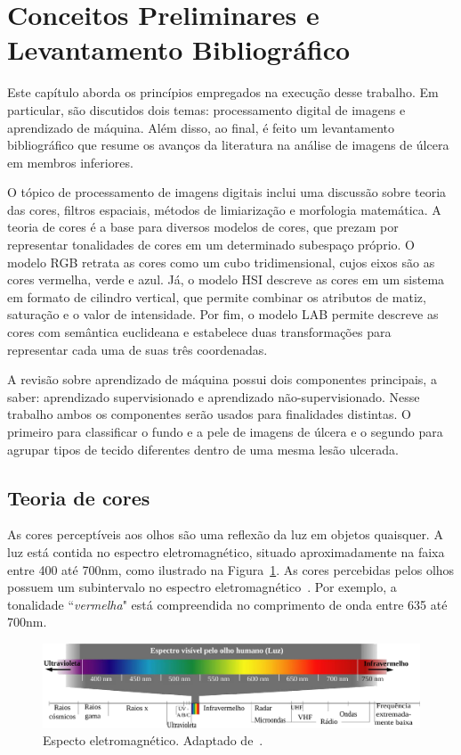 \clearpage
\section{Conceitos Preliminares e Levantamento Bibliográfico}\label{sec:background}

Este capítulo aborda os princípios empregados na execução desse trabalho.
Em particular, são discutidos dois temas: processamento digital de imagens e aprendizado de máquina.
Além disso, ao final, é feito um levantamento bibliográfico que resume os avanços da literatura na análise de imagens de úlcera em membros inferiores.

O tópico de processamento de imagens digitais inclui uma discussão sobre teoria das cores, filtros espaciais, métodos de limiarização e morfologia matemática.
A teoria de cores é a base para diversos modelos de cores, que prezam por representar tonalidades de cores em um determinado subespaço próprio.
O modelo RGB retrata as cores como um cubo tridimensional, cujos eixos são as cores vermelha, verde e azul.
Já, o modelo HSI descreve as cores em um sistema em formato de cilindro vertical, que permite combinar os atributos de matiz, saturação e o valor de intensidade.
Por fim, o modelo LAB permite descreve as cores com semântica euclideana e estabelece duas transformações para representar cada uma de suas três coordenadas.

A revisão sobre aprendizado de máquina possui dois componentes principais, a saber: aprendizado supervisionado e aprendizado não-supervisionado.
Nesse trabalho ambos os componentes serão usados para finalidades distintas.
O primeiro para classificar o fundo e a pele de imagens de úlcera e o segundo para agrupar tipos de tecido diferentes dentro de uma mesma lesão ulcerada.

\subsection{Teoria de cores}

As cores perceptíveis aos olhos são uma reflexão da luz em objetos quaisquer.
A luz está contida no espectro eletromagnético, situado aproximadamente na faixa entre 400 até 700nm, como ilustrado na Figura~\ref{figEspectroEletromagnetico}.
As cores percebidas pelos olhos possuem um subintervalo no espectro eletromagnético~\cite{Gonzalez2008}.
Por exemplo, a tonalidade ``\textit{vermelha}" está compreendida no comprimento de onda entre 635 até 700nm.

\begin{figure}[!htb]
    \centering
    \includegraphics[scale=0.77]{_fig/espectroEletromagnetico.pdf}
    \caption[Especto eletromagnético]{Especto eletromagnético. Adaptado de~.}
    \label{figEspectroEletromagnetico}
\end{figure}

